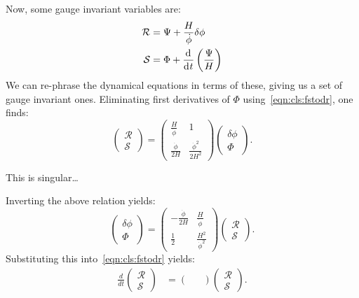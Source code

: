 Now, some gauge invariant variables are:
\begin{align}
  \mathcal{R} &= \Psi + \frac{H}{\dot{\phi}}\delta\phi \\
  \mathcal{S} &= \Phi + \frac{\operatorname{d}^{}\!{}}{\operatorname{d}^{}\!{t}}\left(\frac{\Psi}{H}\right)
\end{align}
We can re-phrase the dynamical equations in terms of these, giving us a set of gauge invariant ones. Eliminating first derivatives of $\Phi$ using~\eqref{eqn:cls:fstodr}, one finds:
\begin{equation}
  \left(
  \begin{array}{c}
    \mathcal{R} \\
    \mathcal{S}
  \end{array}
  \right)
  =
  \left(%
  \begin{array}{cc}
    \frac{H}{\dot{\phi}} & 1 \\
    \frac{\dot{\phi}}{2H} & \frac{\dot{\phi}^2}{2H^2}
  \end{array}
  \right)
  \left(%
  \begin{array}{c}
    \delta \phi \\
    \Phi
  \end{array}
  \right).
\end{equation}

This is singular\ldots

\pagebreak

Inverting the above relation yields:
\begin{equation}
  \left(%
  \begin{array}{c}
    \delta \phi \\
    \Phi
  \end{array}
  \right)
  =
  \left(%
  \begin{array}{cc}
    -\frac{\dot{\phi}}{2H} & \frac{H}{\dot{\phi}} \\
    \frac{1}{2} & \frac{H^2}{\dot{\phi}^2}
  \end{array}
  \right)
  \left(%
  \begin{array}{c}
    \mathcal{R} \\
    \mathcal{S}
  \end{array}
  \right).
\end{equation}
Substituting this into~\eqref{eqn:cls:fstodr} yields:
\begin{align}
  \frac{d}{dt}
  \left(%
  \begin{array}{c}
    \mathcal{R} \\
    \mathcal{S}
  \end{array}
  \right)
  &=
  \left(%
  \begin{array}{cc}
    & \\
    &
  \end{array}
  \right)
  \left(%
  \begin{array}{c}
    \mathcal{R} \\
    \mathcal{S}
  \end{array}
  \right).
\end{align}
